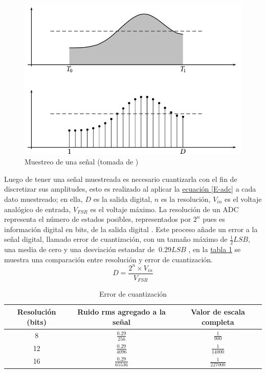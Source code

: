 \documentclass[11pt,lettersize]{article} %
\newcommand{\tabla}[1]{\hyperref[{#1}]{tabla \ref*{#1}}}
\newcommand{\ecuacion}[1]{\hyperref[{#1}]{ecuación \ref*{#1}}}
\begin{document}
\begin{figure}[h!]
	\centering
	\includegraphics[width=.6\textwidth]{images/sampling.png}
	\caption[Muestreo de una señal]{Muestreo de una señal (tomada de \cite{Prandoni2008})}
	\label{F-sampling}
\end{figure}

Luego de tener una señal muestreada es necesario cuantizarla con el fin de discretizar sus amplitudes, esto es realizado al aplicar la \ecuacion{E-adc} a cada dato muestreado; en ella, $D$ es la salida digital, $n$ es la resolución, $V_{in}$ es el voltaje analógico de entrada, $V_{FSR}$ es el voltaje máximo. La resolución de un ADC representa el número de estados posibles, representados por $2^{n}$ pues es información digital en bits, de la salida digital \cite{AnalogDevices2005}. Este proceso añade un error a la señal digital, llamado error de cuantización, con un tamaño máximo de $\frac{1}{2}LSB$, una media de cero y una desviación estandar de $~0.29LSB$ \cite{Rodriguez2012}, en la \tabla{T-adc-error-c} se muestra una comparación entre resolución y error de cuantización.
\begin{equation}
	D = \frac{2^{n} \times V_{in}}{V_{FSR}}
	\label{E-adc}
\end{equation}
\begin{table}[H]
	\begin{center}
			\begin{tabular}{|c|c|c|}
				\hline
				\textbf{Resolución (bits)} & \textbf{Ruido rms agregado a la señal} & \textbf{Valor de escala completa} \\ \hline
				8 & $\frac{0.29}{256}$ & $\frac{1}{900}$ \\ \hline
				12 & $\frac{0.29}{4096}$ & $\frac{1}{14000}$ \\ \hline
				16 & $\frac{0.29}{65536}$ & $\frac{1}{227000}$ \\ \hline
			\end{tabular}
	\caption{Error de cuantización}
	\label{T-adc-error-c}
	\end{center}
\end{table}
\end{document}
